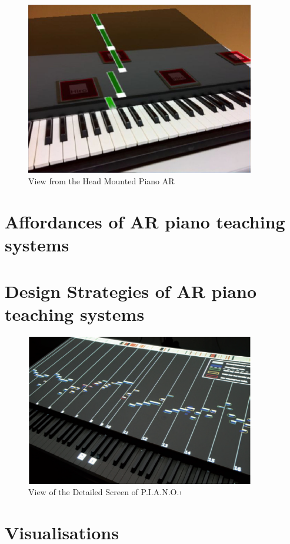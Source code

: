 \documentclass{article}
\begin{document}
\begin{figure}
    \centering
    \includegraphics[width=10cm]{figures/headmountedview.png}
    \caption{View from the Head Mounted Piano AR  }
    \label{fig:View from the HeadMounted}
\end{figure}


\section{Affordances of AR piano teaching systems}


\section{Design Strategies of AR piano teaching systems}

\begin{figure}
    \centering
    \includegraphics[width=10cm]{figures/piano}
    \caption{View of the Detailed Screen of P.I.A.N.O.› }
    \label{fig:View from the HeadMounted}
\end{figure}



\section{Visualisations}
\end{document}
